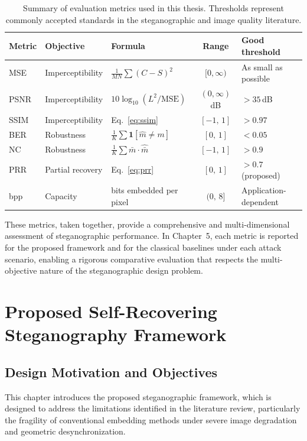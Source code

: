 \documentclass[12pt,a4paper,oneside]{report}
\begin{document}
	\begin{table}[htbp]
		\centering
		\caption{Summary of evaluation metrics used in this thesis. Thresholds represent
			commonly accepted standards in the steganographic and image quality literature.}
		\label{tab:metrics_summary}
		\renewcommand{\arraystretch}{1.35}
		\small
		\begin{tabular}{@{} l l l c l @{}}
			\toprule
			\textbf{Metric} & \textbf{Objective} & \textbf{Formula} & \textbf{Range}
			& \textbf{Good threshold} \\
			\midrule
			MSE  & Imperceptibility & $\frac{1}{MN}\sum(C-S)^2$ & $[0, \infty)$ & As small as possible \\
			PSNR & Imperceptibility & $10\log_{10}(L^2/\mathrm{MSE})$ & $(0, \infty)$ dB & $> 35$\,dB \\
			SSIM & Imperceptibility & Eq.~\eqref{eq:ssim} & $[-1,\,1]$ & $> 0.97$ \\
			\midrule
			BER  & Robustness & $\frac{1}{K}\sum \mathbf{1}[\hat{m}\neq m]$ & $[0,\,1]$ & $< 0.05$ \\
			NC   & Robustness & $\frac{1}{K}\sum \bar{m}\cdot\hat{\bar{m}}$ & $[-1,\,1]$ & $> 0.9$ \\
			PRR  & Partial recovery & Eq.~\eqref{eq:prr} & $[0,\,1]$ & $> 0.7$ (proposed) \\
			\midrule
			bpp  & Capacity & bits embedded per pixel & $(0,\,8]$ & Application-dependent \\
			\bottomrule
		\end{tabular}
	\end{table}
	
	These metrics, taken together, provide a comprehensive and multi-dimensional assessment of
	steganographic performance. In Chapter~5, each metric is reported for the proposed framework
	and for the classical baselines under each attack scenario, enabling a rigorous comparative
	evaluation that respects the multi-objective nature of the steganographic design problem.
	
	
	\chapter{Proposed Self-Recovering Steganography Framework}
	
	\section{Design Motivation and Objectives}
	This chapter introduces the proposed steganographic framework, which is designed to address the limitations identified in the literature review, particularly the fragility of conventional embedding methods under severe image degradation and geometric desynchronization.
	
\end{document}
